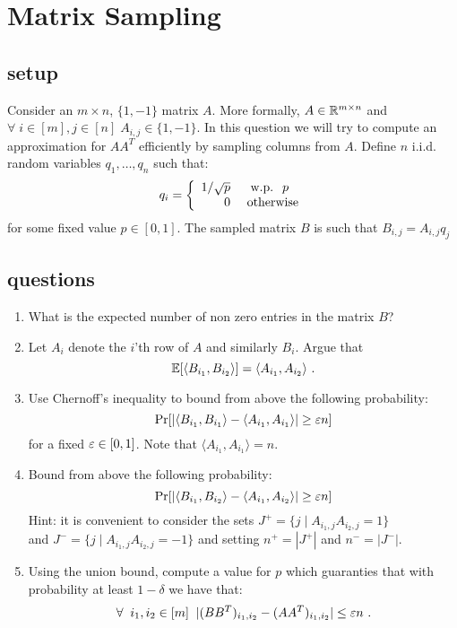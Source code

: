 \documentclass{article}
\begin{document}
\section{Matrix Sampling}
\subsection*{setup}
Consider an $m \times n$, $\{1,-1\}$ matrix $A$. More formally, $A \in {\mathbb{R}}^{m\times n}$ and $\forall \;i \in [m], j\in[n] \; A_{i,j} \in \{1,-1\}$.
In this question we will try to compute an approximation for $AA^T$ efficiently by sampling columns from $A$.
Define $n$ i.i.d. random variables $q_1,\ldots,q_n$ such that:
\begin{equation*}
q_i = \left\{ 
\begin{array}{rl}
1/\sqrt{p} & \mbox{\; w.p. \;} p \\
0 &\mbox{ otherwise}
\end{array} 
\right.
\end{equation*}
for some fixed value $p \in [0,1]$.
The sampled matrix $B$ is such that $B_{i,j} = A_{i,j}q_j$







\subsection*{questions}
\begin{enumerate}
\item What is the expected number of non zero entries in the matrix $B$?
\item Let $A_{i}$ denote the $i$'th row of $A$ and similarly $B_{i}$. Argue that $${\mathbb E}[\langle B_{i_1}, B_{i_2} \rangle] =  \langle A_{i_1}, A_{i_2} \rangle \ . $$
\item Use Chernoff's inequality to bound from above the following probability:
\[
\Pr[ | \langle B_{i_1}, B_{i_1} \rangle - \langle A_{i_1}, A_{i_1} \rangle | \ge \varepsilon n ]
\]
for a fixed $\varepsilon \in [0,1]$. Note that $\langle A_{i_1}, A_{i_1} \rangle = n$.
\item Bound from above the following probability:
\[
\Pr[ | \langle B_{i_1}, B_{i_2} \rangle - \langle A_{i_1}, A_{i_2} \rangle | \ge \varepsilon n ] 
\]
Hint: it is convenient to consider the sets $ J^{+} = \{ j \;| \;A_{i_1,j} A_{i_2,j} = 1\}$ \\and $ J^{-} = \{ j \;| \;A_{i_1,j} A_{i_2,j} = -1\}$
and setting $n^{+} = |J^{+}|$ and $n^{-} = |J^{-}|$.

\item Using the union bound, compute a value for $p$ which guaranties that with probability at least $1-\delta$ we have that:
$$ \forall \;\;  i_1,i_2 \in [m] \;\;   |(BB^T)_{i_1,i_2}  - (AA^T)_{i_1,i_2}| \le \eps n \ . $$
\end{enumerate}
\pagebreak
\end{document}
